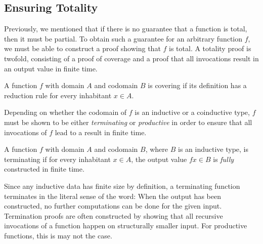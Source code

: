 
\subsection{Ensuring Totality}
Previously, we mentioned that if there is no guarantee that a function is total,
then it must be partial. To obtain such a guarantee for an arbitrary function
$f$, we must be able to construct a proof showing that $f$ is total. A totality
proof is twofold, consisting of a proof of coverage and a proof that all
invocations result in an output value in finite time.

\begin{definition}
  A function $f$ with domain $A$ and codomain $B$ is covering if its definition
  has a reduction rule for every inhabitant $x\in A$.
\end{definition}

Depending on whether the codomain of $f$ is an inductive or a coinductive type,
$f$ must be shown to be either \emph{terminating} or \emph{productive} in order
to ensure that all invocations of $f$ lead to a result in finite time.

\begin{definition}
\label{def:terminating_function}
  A function $f$ with domain $A$ and codomain $B$, where $B$ is an inductive
  type, is terminating if for every inhabitant $x\in A$, the output value
  $f x\in B$ is \emph{fully} constructed in finite time.
\end{definition}

Since any inductive data has finite size by definition, a terminating function
terminates in the literal sense of the word: When the output has been
constructed, no further computations can be done for the given
input. Termination proofs are often constructed by showing that all recursive
invocations of a function happen on structurally smaller input. For
productive functions, this is may not the case.

